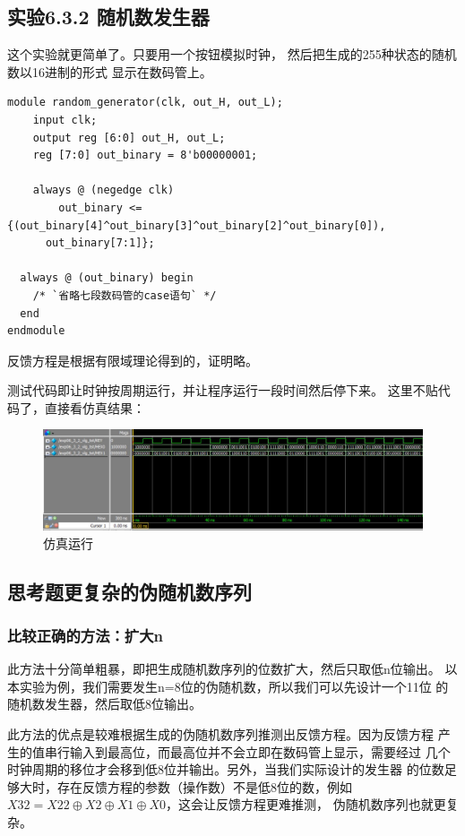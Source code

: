 \documentclass[12pt,a4paper,UTF8]{article}
\begin{document}
\subsection{实验6.3.2 随机数发生器}
这个实验就更简单了。只要用一个按钮模拟时钟，
然后把生成的255种状态的随机数以16进制的形式
显示在数码管上。
\begin{lstlisting}[style=verilog-style]
module random_generator(clk, out_H, out_L);
	input clk;
	output reg [6:0] out_H, out_L;
	reg [7:0] out_binary = 8'b00000001;
	
	always @ (negedge clk)
		out_binary <= {(out_binary[4]^out_binary[3]^out_binary[2]^out_binary[0]),
      out_binary[7:1]};

  always @ (out_binary) begin
    /* `省略七段数码管的case语句` */
  end
endmodule
\end{lstlisting}

反馈方程是根据有限域理论得到的，证明略。

测试代码即让时钟按周期运行，并让程序运行一段时间然后停下来。
这里不贴代码了，直接看仿真结果：
\begin{figure}[H]
  \centering
  \includegraphics[width=1\textwidth]{2_sim.JPG}
  \caption{仿真运行}
  \label{2_sim}
\end{figure}

\subsection{思考题\quad 更复杂的伪随机数序列}
\subsubsection{比较正确的方法：扩大n}
此方法十分简单粗暴，即把生成随机数序列的位数扩大，然后只取低n位输出。
以本实验为例，我们需要发生n=8位的伪随机数，所以我们可以先设计一个11位
的随机数发生器，然后取低8位输出。

此方法的优点是较难根据生成的伪随机数序列推测出反馈方程。因为反馈方程
产生的值串行输入到最高位，而最高位并不会立即在数码管上显示，需要经过
几个时钟周期的移位才会移到低8位并输出。另外，当我们实际设计的发生器
的位数足够大时，存在反馈方程的参数（操作数）不是低8位的数，例如
$X32=X22\oplus X2\oplus X1\oplus X0$，这会让反馈方程更难推测，
伪随机数序列也就更复杂。
\end{document}

